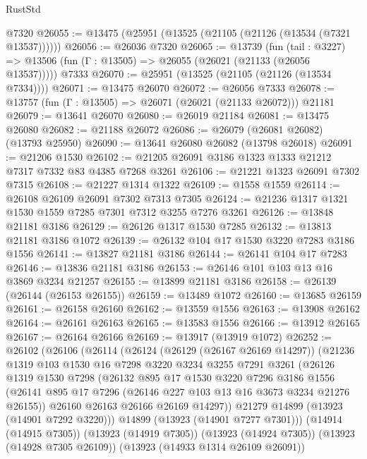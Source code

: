 \begin{lexlean}{RustStd}
\begin{coremodule}
    @7320
@26055 := @13475 (@25951 (@13525 (@21105 (@21126 (@13534 (@7321 @13537))))))
@26056 := @26036 @7320
@26065 := @13739
    (fun (tail : @3227) => @13506 (fun (Γ : @13505) => @26055 (@26021 (@21133 (@26056 @13537)))))
    @7333
@26070 := @25951 (@13525 (@21105 (@21126 (@13534 @7334))))
@26071 := @13475 @26070
@26072 := @26056 @7333
@26078 := @13757 (fun (Γ : @13505) => @26071 (@26021 (@21133 @26072))) @21181
@26079 := @13641 @26070
@26080 := @26019 @21184
@26081 := @13475 @26080
@26082 := @21188 @26072
@26086 := @26079 (@26081 @26082) (@13793 @25950)
@26090 := @13641 @26080 @26082 (@13798 @26018)
@26091 := @21206 @1530
@26102 := @21205 @26091 @3186 @1323 @1333 @21212 @7317 @7332 @83 @4385 @7268 @3261
@26106 := @21221 @1323 @26091 @7302 @7315
@26108 := @21227 @1314 @1322
@26109 := @1558 @1559
@26114 := @26108 @26109 @26091 @7302 @7313 @7305
@26124 := @21236 @1317 @1321 @1530 @1559 @7285 @7301 @7312 @3255 @7276 @3261
@26126 := @13848 @21181 @3186
@26129 := @26126 @1317 @1530 @7285
@26132 := @13813 @21181 @3186 @1072
@26139 := @26132 @104 @17 @1530 @3220 @7283 @3186 @1556
@26141 := @13827 @21181 @3186
@26144 := @26141 @104 @17 @7283
@26146 := @13836 @21181 @3186
@26153 := @26146 @101 @103 @13 @16 @3869 @3234 @21257
@26155 := @13899 @21181 @3186
@26158 := @26139 (@26144 (@26153 @26155))
@26159 := @13489 @1072
@26160 := @13685 @26159
@26161 := @26158 @26160
@26162 := @13559 @1556
@26163 := @13908 @26162
@26164 := @26161 @26163
@26165 := @13583 @1556
@26166 := @13912 @26165
@26167 := @26164 @26166
@26169 := @13917 (@13919 @1072)
@26252 := @26102
    (@26106
      (@26114
        (@26124
          (@26129 (@26167 @26169 @14297))
          (@21236
            @1319
            @103
            @1530
            @16
            @7298
            @3220
            @3234
            @3255
            @7291
            @3261
            (@26126
              @1319
              @1530
              @7298
              (@26132
                @895
                @17
                @1530
                @3220
                @7296
                @3186
                @1556
                (@26141 @895 @17 @7296 (@26146 @227 @103 @13 @16 @3673 @3234 @21276 @26155))
                @26160
                @26163
                @26166
                @26169
                @14297))
            @21279
            @14899
            (@13923 (@14901 @7292 @3220)))
          @14899
          (@13923 (@14901 @7277 @7301)))
        (@14914 (@14915 @7305))
        (@13923 (@14919 @7305))
        (@13923 (@14924 @7305))
        (@13923 (@14928 @7305 @26109))
        (@13923 (@14933 @1314 @26109 @26091))

\end{coremodule}
\end{lexlean}
